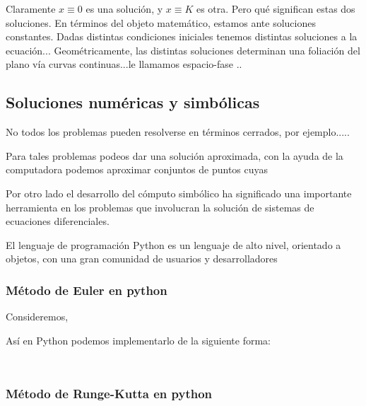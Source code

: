 Claramente $x\equiv 0$ es una solución, y $x\equiv K$ es otra. Pero qué significan estas dos soluciones. En términos del objeto matemático, estamos ante soluciones constantes. Dadas distintas condiciones iniciales tenemos distintas soluciones a la ecuación... Geométricamente, las distintas soluciones determinan una foliación del plano vía curvas continuas...le llamamos espacio-fase ..



\subsection{Soluciones numéricas y simbólicas }

No todos los problemas pueden resolverse en términos cerrados, por ejemplo.....

Para tales problemas podeos dar una solución aproximada, con la ayuda de la computadora podemos aproximar conjuntos de puntos cuyas

Por otro lado el desarrollo del cómputo simbólico ha significado una importante herramienta en los problemas que involucran la solución de sistemas de ecuaciones diferenciales.

El lenguaje de programación Python es un lenguaje de alto nivel, orientado a objetos, con una gran comunidad de usuarios y desarrolladores

\subsubsection{Método de Euler en python}

Consideremos,


Así en Python podemos implementarlo de la siguiente forma:
\begin{verbatim}
    
\end{verbatim}

\subsubsection{Método de Runge-Kutta en python}


